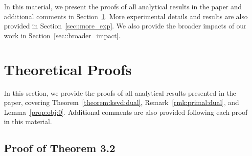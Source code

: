 \documentclass{article}
\begin{document}
In this material, we present the proofs of all analytical results in the paper and additional comments in Section~\ref{sec::proofs}.
More experimental details and results are also provided in Section~\ref{sec::more_exp}.
We also provide the broader impacts of our work in Section~\ref{sec::broader_impact}.

\section{Theoretical Proofs}
\label{sec::proofs}
In this section, we provide the proofs of all analytical results presented in the paper, covering Theorem~\ref{theorem:ksvd:dual}, Remark~\ref{rmk:primal:dual}, and Lemma~\ref{prop:obj:0}. 
Additional comments are also provided following each proof in this material.

\subsection{Proof of Theorem 3.2}
\end{document}
